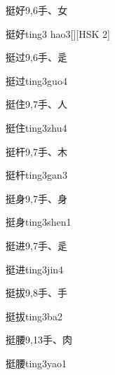 \begin{entry}{挺好}{9,6}{⼿、⼥}
  \begin{phonetics}{挺好}{ting3 hao3}[][HSK 2]
  \end{phonetics}
\end{entry}

\begin{entry}{挺过}{9,6}{⼿、⾡}
  \begin{phonetics}{挺过}{ting3guo4}
  \end{phonetics}
\end{entry}

\begin{entry}{挺住}{9,7}{⼿、⼈}
  \begin{phonetics}{挺住}{ting3zhu4}
  \end{phonetics}
\end{entry}

\begin{entry}{挺杆}{9,7}{⼿、⽊}
  \begin{phonetics}{挺杆}{ting3gan3}
  \end{phonetics}
\end{entry}

\begin{entry}{挺身}{9,7}{⼿、⾝}
  \begin{phonetics}{挺身}{ting3shen1}
  \end{phonetics}
\end{entry}

\begin{entry}{挺进}{9,7}{⼿、⾡}
  \begin{phonetics}{挺进}{ting3jin4}
  \end{phonetics}
\end{entry}

\begin{entry}{挺拔}{9,8}{⼿、⼿}
  \begin{phonetics}{挺拔}{ting3ba2}
  \end{phonetics}
\end{entry}

\begin{entry}{挺腰}{9,13}{⼿、⾁}
  \begin{phonetics}{挺腰}{ting3yao1}
  \end{phonetics}
\end{entry}


